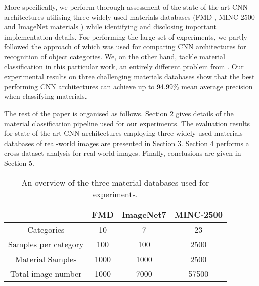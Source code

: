 \documentclass[a4paper,twoside]{article}
\begin{document}
More specifically, we perform thorough assessment of the state-of-the-art CNN architectures utilising three widely used materials databases (FMD \cite{13}, MINC-2500 \cite{24} and ImageNet materials \cite{15}) while identifying and disclosing important implementation details. For performing the large set of experiments, we partly followed the approach of \cite{20} which was used for comparing CNN architectures for recognition of object categories. We, on the other hand, tackle material classification in this particular work, an entirely different problem from \cite{20}. Our experimental results on three challenging materials databases show that the best performing CNN architectures can achieve up to 94.99\% mean average precision when classifying materials.

The rest of the paper is organised as follows. Section 2 gives details of the material classification pipeline used for our experiments. The evaluation results for state-of-the-art CNN architectures employing three widely used materials databases of real-world images are presented in Section 3. Section 4 performs a cross-dataset analysis for real-world images. Finally, conclusions are given in Section 5.

\begin{table*}[t]
\centering
\caption{An overview of the three material databases used for experiments.}
\label{my-label}
\begin{tabular}{c|c|c|c|}
\cline{2-4}
                                           & \textbf{FMD} & \textbf{ImageNet7} & \textbf{MINC-2500} \\ \hline
\multicolumn{1}{|c|}{Categories}           & 10           & 7                  & 23                 \\ \hline
\multicolumn{1}{|c|}{Samples per category} & 100          & 100                & 2500               \\ \hline
\multicolumn{1}{|c|}{Material Samples}     & 1000         & 1000               & 2500               \\ \hline
\multicolumn{1}{|c|}{Total image number}   & 1000         & 7000               & 57500              \\ \hline
\end{tabular}
\end{table*}
\end{document}
